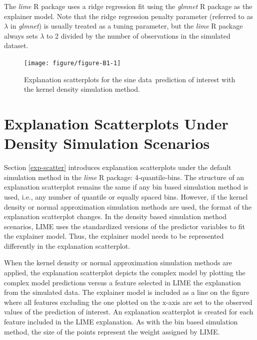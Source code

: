 \documentclass[AMS,STIX2COL]{WileyNJD-v2}\usepackage[]{graphicx}\usepackage[]{color}
\newenvironment{knitrout}{}{} %
\newcommand{\data}{sine data}
\begin{document}
The \emph{lime} R package uses a ridge regression fit using the \emph{glmnet} R package \citep{simon:2011} as the explainer model. Note that the ridge regression penalty parameter (referred to as $\lambda$ in \emph{glmnet}) is usually treated as a tuning parameter, but the \emph{lime} R package always sets $\lambda$ to 2 divided by the number of observations in the simulated dataset.

\begin{figure}[!thp]
\begin{knitrout}
\color{fgcolor}

{\centering \texttt{[image: figure/figure-B1-1]} 

}



\end{knitrout}
\caption{Explanation scatterplots for the \data \ prediction of interest with the kernel density simulation method.}
\label{fig:figure-B1}
\end{figure}

\section{Explanation Scatterplots Under  Density Simulation Scenarios} \label{exp-scatter_plus}

Section \ref{exp-scatter} introduces explanation scatterplots under the default simulation method in the \emph{lime} R package: 4-quantile-bins. The structure of an explanation scatterplot remains the same if any bin based simulation method is used, i.e., any number of quantile or equally spaced bins. However, if the kernel density or normal approximation simulation methods are used, the format of the explanation scatterplot changes. In the density based simulation method scenarios, LIME uses the standardized versions of the predictor variables to fit the explainer model. Thus, the explainer model needs to be represented differently in the explanation scatterplot.

When the kernel density or normal approximation simulation methods are applied, the explanation scatterplot depicts the complex model by plotting the complex model predictions versus a feature selected in LIME the explanation from the simulated data. The explainer model is included as a line on the figure where all features excluding the one plotted on the x-axis are set to the observed values of the prediction of interest. An explanation scatterplot is created for each feature included in the LIME explanation. As with the bin based simulation method, the size of the points represent the weight assigned by LIME.
\end{document}
